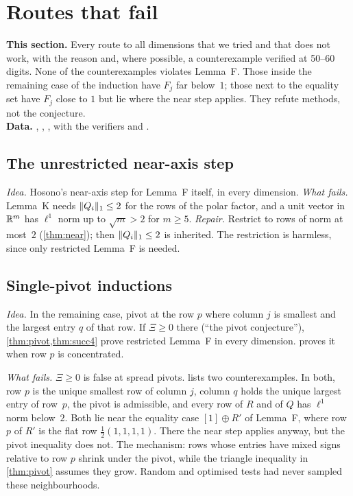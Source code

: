 \documentclass[11pt,a4paper]{article}
\begin{document}
\section{Routes that fail}\label{sec:failed}

\begin{summarybox}
\textbf{This section.} Every route to all dimensions that we tried and that does not work, with the reason and, where possible, a counterexample verified at 50--60 digits. None of the counterexamples violates Lemma~F. Those inside the remaining case of the induction have $F_j$ far below~$1$; those next to the equality set have $F_j$ close to $1$ but lie where the near step applies. They refute methods, not the conjecture.\\
\textbf{Data.} , , , with the verifiers  and .
\end{summarybox}

\subsection{The unrestricted near-axis step}
\emph{Idea.} Hosono's near-axis step for Lemma~F itself, in every dimension. \emph{What fails.} Lemma~K needs $\lVert Q_i\rVert_1\le2$ for the rows of the polar factor, and a unit vector in $\mathbb R^m$ has $\ell^1$ norm up to $\sqrt m>2$ for $m\ge5$. \emph{Repair.} Restrict to rows of norm at most~$2$ (\cref{thm:near}); then $\lVert Q_i\rVert_1\le2$ is inherited. The restriction is harmless, since only restricted Lemma~F is needed.

\subsection{Single-pivot inductions}\label{sec:pivotfail}
\emph{Idea.} In the remaining case, pivot at the row $p$ where column $j$ is smallest and the largest entry $q$ of that row. If $\Xi\ge0$ there (``the pivot conjecture''), \cref{thm:pivot,thm:succ4} prove restricted Lemma~F in every dimension.  proves it when row $p$ is concentrated.

\emph{What fails.} $\Xi\ge0$ is false at spread pivots.  lists two counterexamples. In both, row $p$ is the unique smallest row of column $j$, column $q$ holds the unique largest entry of row~$p$, the pivot is admissible, and every row of $R$ and of $Q$ has $\ell^1$ norm below~$2$. Both lie near the equality case $[1]\oplus R'$ of Lemma~F, where row $p$ of $R'$ is the flat row $\frac12(1,1,1,1)$. There the near step applies anyway, but the pivot inequality does not. The mechanism: rows whose entries have mixed signs relative to row $p$ shrink under the pivot, while the triangle inequality in \cref{thm:pivot} assumes they grow. Random and optimised tests had never sampled these neighbourhoods.
\end{document}
